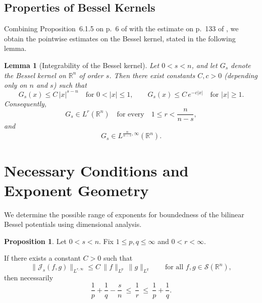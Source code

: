 \documentclass[12pt]{article}
\newtheorem{lemma}[theorem]{Lemma}
\theoremstyle{definition}
\newtheorem{proposition}[theorem]{Proposition}
\theoremstyle{remark}
\numberwithin{equation}{section}
\begin{document}
\subsection{Properties of Bessel Kernels}
Combining Proposition~6.1.5 on p.~6 of \cite{GraMod} with the estimate on p.~133 of \cite{Ste}, we obtain the pointwise estimates on the Bessel kernel, stated in the following lemma. 
 
\begin{lemma}[Integrability of the Bessel kernel] 
\label{lem:bessel-kernel-Lr}
Let $0<s<n$, and let $G_s$ denote the Bessel kernel on $\mathbb R^n$ of order $s$.
Then there exist constants $C,c>0$ (depending only on $n$ and $s$) such that
\begin{equation}\label{eq:Gs-pointwise}
G_s(x)\le C\,|x|^{s-n}\quad \text{for }0<|x|\le 1,
\qquad
G_s(x)\le C\,e^{-c|x|}\quad \text{for }|x|\ge 1.
\end{equation}
Consequently,
\begin{equation}\label{eq:Gs-Lr-range}
G_s\in L^r(\mathbb R^n)
\quad\text{for every}\quad
1\le r<\frac{n}{n-s},
\end{equation}
and
\[
G_s\in L^{\frac{n}{n-s},\infty}(\mathbb R^n).
\]
\end{lemma}

\section{Necessary Conditions and Exponent Geometry}

We determine the possible range of exponents for boundedness of the bilinear
Bessel potentials using dimensional analysis.


\begin{proposition}
\label{prop:necessary-conds-weak}
Let $0<s<n$.
Fix $1\le p,q\le \infty$ and $0<r<\infty$.  

If there exists a constant $C>0$ such that
\[
\|\mathcal J_s(f,g)\|_{L^{r,\infty}}
\le C\,\|f\|_{L^p}\,\|g\|_{L^q}
\qquad\text{for all }f,g\in \mathcal S(\mathbb R^n),
\]
then necessarily
\begin{equation}\label{eq:necessary-strip}
\frac1p+\frac1q-\frac{s}{n}\ \le\ \frac1r\ \le\ \frac1p+\frac1q.
\end{equation}
\end{proposition}
\end{document}
